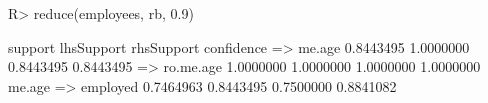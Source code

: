 \begin{Schunk}
% --begin: "reduce"
\begin{Sinput}
R> reduce(employees, rb, 0.9)
\end{Sinput}
\begin{Soutput}
                     support lhsSupport rhsSupport confidence
 => me.age         0.8443495  1.0000000  0.8443495  0.8443495
 => ro.me.age      1.0000000  1.0000000  1.0000000  1.0000000
me.age => employed 0.7464963  0.8443495  0.7500000  0.8841082
\end{Soutput}
%
% --end: "reduce"
\end{Schunk}
